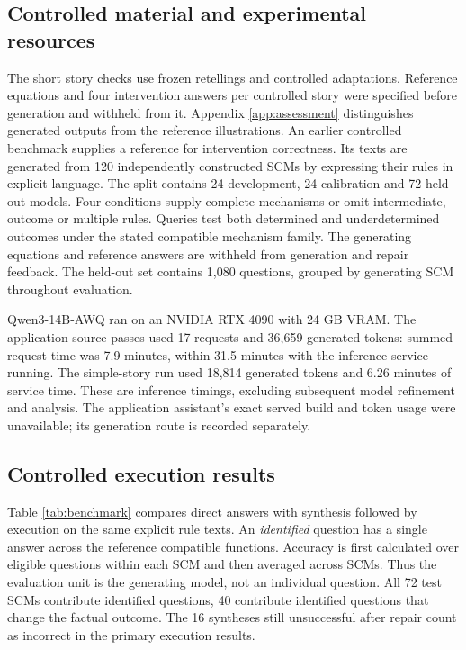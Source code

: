 \documentclass{svproc}
\begin{document}
\subsection{Controlled material and experimental resources}
The short story checks use frozen retellings and controlled adaptations. Reference equations and four intervention answers per controlled story were specified before generation and withheld from it. Appendix \ref{app:assessment} distinguishes generated outputs from the reference illustrations.
An earlier controlled benchmark supplies a reference for intervention correctness. Its texts are generated from 120 independently constructed SCMs by expressing their rules in explicit language. The split contains 24 development, 24 calibration and 72 held-out models. Four conditions supply complete mechanisms or omit intermediate, outcome or multiple rules. Queries test both determined and underdetermined outcomes under the stated compatible mechanism family. The generating equations and reference answers are withheld from generation and repair feedback. The held-out set contains 1,080 questions, grouped by generating SCM throughout evaluation.

Qwen3-14B-AWQ ran on an NVIDIA RTX 4090 with 24 GB VRAM. The application source passes used 17 requests and 36,659 generated tokens: summed request time was 7.9 minutes, within 31.5 minutes with the inference service running. The simple-story run used 18,814 generated tokens and 6.26 minutes of service time. These are inference timings, excluding subsequent model refinement and analysis. The application assistant's exact served build and token usage were unavailable; its generation route is recorded separately.

\subsection{Controlled execution results}\label{sec:benchmark}
Table \ref{tab:benchmark} compares direct answers with synthesis followed by execution on the same explicit rule texts. An \emph{identified} question has a single answer across the reference compatible functions. Accuracy is first calculated over eligible questions within each SCM and then averaged across SCMs. Thus the evaluation unit is the generating model, not an individual question. All 72 test SCMs contribute identified questions, 40 contribute identified questions that change the factual outcome. The 16 syntheses still unsuccessful after repair count as incorrect in the primary execution results.
\end{document}
